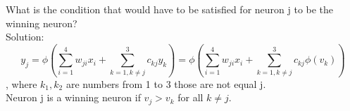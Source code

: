 \documentclass[a4paper, 12pt]{article}
\begin{document}
What is the condition that would have to be satisfied for neuron j to be the winning neuron?\\

Solution:\\

$$y_j = \phi(\sum_{i=1}^{4} w_{ji}x_i  + \sum_{k=1, k \neq j}^{3} c_{kj}y_k) = \phi(\sum_{i=1}^{4} w_{ji}x_i + \sum_{k=1, k \neq j}^{3} c_{kj}\phi(v_k))$$, where $k_1, k_2$ are numbers from 1 to 3 those are not equal j.\\

Neuron j is a winning neuron if $v_j > v_k$ for all $k \neq j$.
\end{document}
